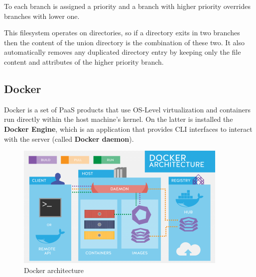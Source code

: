 \documentclass{article}
\begin{document}
To each branch is assigned a priority and a branch with higher priority overrides branches with lower one. 

This filesystem operates on directories, so if a directory exits in two branches then the content of the union directory is the combination of these two. It also automatically removes any duplicated directory entry by keeping only the file content and attributes of the higher priority branch.

\subsection{Docker}
Docker is a set of PaaS products that use OS-Level virtualization and containers run directly within the host machine's kernel. On the latter is installed the \textbf{Docker Engine}, which is an application that provides CLI interfaces to interact with the server (called \textbf{Docker daemon}).

\begin{figure}[H]
    \centering
    \includegraphics[width=4in]{imgs/dockerarchitecture.png}
    \caption{Docker architecture}
    \label{fig:dockerarchitecture}
\end{figure}
\end{document}
